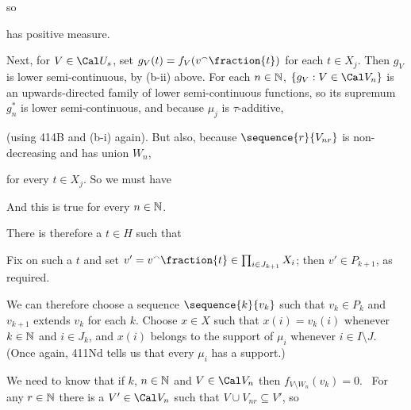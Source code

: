 {\noindent so


\noindent has positive measure.

Next, for $V\in\Cal U_s$, set $g_V(t)=f_V(v^{\smallfrown}\fraction{t})$ for each
$t\in X_j$.   Then $g_V$ is lower semi-continuous, by
(b-ii) above.   For each $n\in\Bbb N$, $\{g_V:V\in\Cal V_n\}$ is an
upwards-directed family of lower semi-continuous functions, so its
supremum $g^*_n$ is lower semi-continuous, and because $\mu_j$ is
$\tau$-additive,


\noindent (using 414B and (b-i) again).   But also, because
$\sequence{r}{V_{nr}}$ is non-decreasing and has union $W_n$,


\noindent for every $t\in X_j$.   So we must have


\noindent And this is true for every $n\in\Bbb N$.

There is therefore a $t\in H$ such that


\noindent Fix on such a $t$ and set
$v'=v^{\smallfrown}\fraction{t}\in\prod_{i\in J_{k+1}}X_i$;
then $v'\in P_{k+1}$, as required.\ \Qed

\medskip

 We can therefore choose a sequence $\sequence{k}{v_k}$
such that $v_k\in P_k$ and $v_{k+1}$ extends $v_k$ for each $k$.
Choose $x\in X$ such that $x(i)=v_k(i)$ whenever $k\in\Bbb N$ and
$i\in J_k$, and $x(i)$ belongs to the support of $\mu_i$ whenever
$i\in I\setminus J$.    (Once again, 411Nd tells us that
every $\mu_i$ has a support.)

We need to know that if $k$, $n\in\Bbb N$ and $V\in\Cal V_n$ then
$f_{V\setminus W_n}(v_k)=0$.   \Prf\ For any $r\in\Bbb N$ there is a
$V'\in\Cal V_n$ such that $V\cup V_{nr}\subseteq V'$, so

}
